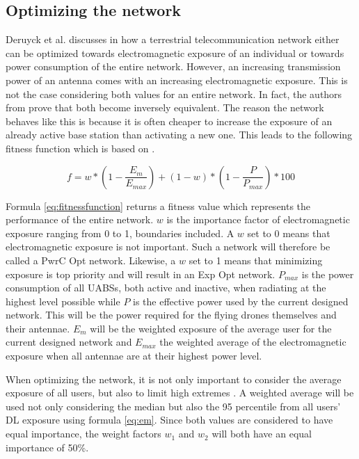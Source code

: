 \documentclass[twocolumn]{phdsymp} %
\begin{document}
\subsection{Optimizing the network}

Deruyck et al. discusses in \cite{J1} how a terrestrial  telecommunication network either can be optimized towards electromagnetic 
exposure of an individual or towards power consumption of the entire network. 
However, an increasing transmission power of an antenna comes with an increasing electromagnetic exposure. This is not the case considering
both values for an entire network. In fact, the authors from \cite{J1}  prove that both become inversely equivalent.
The reason the network behaves like this is because it is often cheaper to increase the exposure of an already active base station 
than activating a new one. 
This leads to the following fitness function which is based on \cite{J1}.

\begin{equation} 
f = w * \left(1 - \frac{E_m}{E_{max}}\right) + (1 - w)*\left(1 - \frac{P}{P_{max}}\right) * 100
\label{eq:fitnessfunction}
\end{equation}

Formula \ref{eq:fitnessfunction} returns a fitness value which represents the performance of the entire network. 
$w$ is the importance factor of electromagnetic exposure ranging from 0 to 1, boundaries included. A $w$ set to 0 means that electromagnetic 
exposure is not important. Such a network will therefore be called a \gls{PwrC Opt} network. 
Likewise, a $w$ set to 1 means that minimizing exposure is top priority and will result in an \gls{Exp Opt} network. $P_{max}$ is the power consumption of all UABSs, 
both active and inactive, when radiating at the highest level possible 
while $P$ is the effective power used by the current designed network. 
This will be the power required for the flying drones themselves and their antennae.
$E_m$ will be the weighted exposure of the average user for the current designed network and $E_{max}$ the weighted average of the electromagnetic exposure when all antennae 
are at their highest power level.

When optimizing the network, it is not only important to consider the average exposure of all users, but also to limit high extremes \cite{J1}. A weighted average 
will be used not only considering the median but also the 95 percentile from all users' \gls{DL} exposure using formula \ref{eq:em}. 
Since both values are considered to have equal importance, the weight factors $w_1$ and $w_2$ will both have an equal importance of 50\%. 
\end{document}
